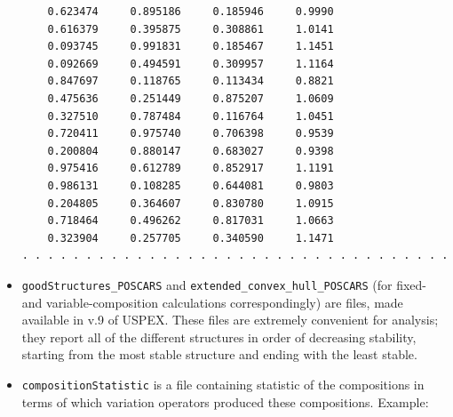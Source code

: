 \documentclass[12pt]{article}
\newcommand{\file}[1]{\texttt{#1}}
\begin{document}
\begin{itemize}
{\begin{verbatim}
    0.623474     0.895186     0.185946     0.9990
    0.616379     0.395875     0.308861     1.0141
    0.093745     0.991831     0.185467     1.1451
    0.092669     0.494591     0.309957     1.1164
    0.847697     0.118765     0.113434     0.8821
    0.475636     0.251449     0.875207     1.0609
    0.327510     0.787484     0.116764     1.0451
    0.720411     0.975740     0.706398     0.9539
    0.200804     0.880147     0.683027     0.9398
    0.975416     0.612789     0.852917     1.1191
    0.986131     0.108285     0.644081     0.9803
    0.204805     0.364607     0.830780     1.0915
    0.718464     0.496262     0.817031     1.0663
    0.323904     0.257705     0.340590     1.1471
. . . . . . . . . . . . . . . . . . . . . . . . . . . . . . . . . .
\end{verbatim}
}

\item \file{goodStructures\_POSCARS} and \file{extended\_convex\_hull\_POSCARS}
(for fixed- and va\-ri\-able-composition calculations correspondingly) are
files, made available in v.9 of USPEX. These files are extremely convenient for
analysis; they report all of the different structures in order of decreasing
stability, starting from the most stable structure and ending with the least
stable.

\item \file{compositionStatistic} is a file containing statistic of the
compositions in terms of which variation operators produced these compositions.
Example:


\end{itemize}
\end{document}
